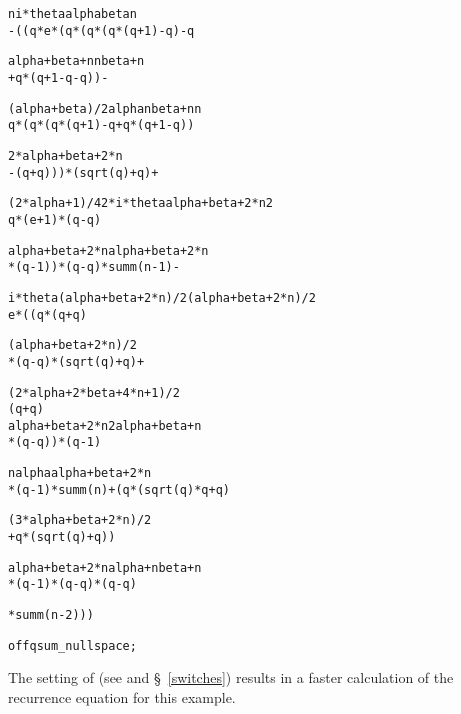 {\footnotesize
\begin{alltt}
      n  i*theta   alpha   beta   n
 - ((q *e       *(q     *(q    *(q *(q + 1) - q) - q

               alpha + beta + n           n    beta + n
            + q                *(q + 1 - q  - q        )) - 

         (alpha + beta)/2   alpha   n                beta + n           n
        q                *(q     *(q *(q + 1) - q + q        *(q + 1 - q ))

                2*alpha + beta + 2*n
            - (q                     + q)))*(sqrt(q) + q) + 

      (2*alpha + 1)/4   2*i*theta        alpha + beta + 2*n    2
     q               *(e          + 1)*(q                   - q )

        alpha + beta + 2*n         alpha + beta + 2*n
     *(q                   - 1))*(q                   - q)*summ(n - 1) - 

     i*theta    (alpha + beta + 2*n)/2   (alpha + beta + 2*n)/2
    e       *((q                      *(q                       + q)

                  (alpha + beta + 2*n)/2
               *(q                       - q)*(sqrt(q) + q) + 

                 (2*alpha + 2*beta + 4*n + 1)/2
               (q                               + q)
\newpage
                  alpha + beta + 2*n    2     alpha + beta + n
               *(q                   - q ))*(q                 - 1)

                 n                  alpha               alpha + beta + 2*n
              *(q  - 1)*summ(n) + (q     *(sqrt(q)*q + q                  )

                     (3*alpha + beta + 2*n)/2
                  + q                        *(sqrt(q) + q))

                 alpha + beta + 2*n        alpha + n        beta + n
              *(q                   - 1)*(q          - q)*(q         - q)

              *summ(n - 2)))

\redprompt off qsum_nullspace;
\end{alltt}}

The setting of  
(see \cite{PauleRiese:95} and \S~\ref{switches})
results in a faster
calculation of the recurrence equation for this example.



